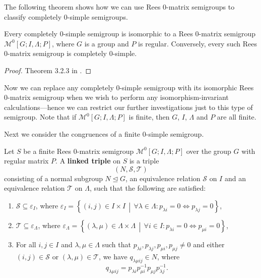 The following theorem shows how we can use Rees 0-matrix semigroups to classify
completely 0-simple semigroups.

\begin{theorem}[Rees]
  \label{thm:rees}
  Every completely 0-simple semigroup is isomorphic to a Rees 0-matrix semigroup
  $\mathcal{M}^0[G;I,\Lambda;P]$, where $G$ is a group and $P$ is regular.
  Conversely, every such Rees 0-matrix semigroup is completely 0-simple.
  \begin{proof}
    Theorem 3.2.3 in \cite{howie}.
  \end{proof}
\end{theorem}

Now we can replace any completely 0-simple semigroup with its isomorphic Rees
0-matrix semigroup when we wish to perform any isomorphism-invariant
calculations---hence we can restrict our further investigations just to this
type of semigroup.  Note that if $\mathcal{M}^0[G;I,\Lambda;P]$ is finite, then
$G$, $I$, $\Lambda$ and $P$ are all finite.

Next we consider the congruences of a finite 0-simple semigroup.

\begin{definition}
  \label{def:linked-triple}
  Let $S$ be a finite Rees 0-matrix semigroup $\mathcal{M}^0[G;I,\Lambda;P]$
  over the group $G$ with regular matrix $P$.  A \textbf{linked triple} on $S$
  is a triple $$(N,\mathcal{S},\mathcal{T})$$ consisting of a normal subgroup
  $N \trianglelefteq G$, an equivalence relation $\mathcal{S}$ on $I$ and an
  equivalence relation $\mathcal{T}$ on $\Lambda$, such that the following are
  satisfied:
  \begin{enumerate}[\rm(1)]
  \item $\mathcal{S} \subseteq \varepsilon_I$, where $\varepsilon_I =
    \left\{(i,j) \in I \times I\, \middle|\, \forall \lambda \in \Lambda:
      p_{\lambda i}=0 \iff p_{\lambda j}=0 \right\}$,
  \item $\mathcal{T} \subseteq \varepsilon_\Lambda$, where $\varepsilon_\Lambda
    = \left\{(\lambda,\mu) \in \Lambda \times \Lambda\, \middle|\, \forall i \in
      I: p_{\lambda i}=0 \iff p_{\mu i}=0 \right\}$,
  \item For all $i,j \in I$ and $\lambda, \mu \in \Lambda$ such that
    $p_{\lambda i}, p_{\lambda j}, p_{\mu i}, p_{\mu j} \neq 0$ and either
    $(i,j) \in \mathcal{S}$ or $(\lambda,\mu) \in \mathcal{T}$, we have
    $q_{\lambda \mu i j} \in N$, where
    $$q_{\lambda \mu i j} = p_{\lambda i} p_{\mu i}^{-1} p_{\mu j} p_{\lambda
      j}^{-1}.$$
  \end{enumerate}
  \cite[\S 3.5]{howie}
\end{definition}

